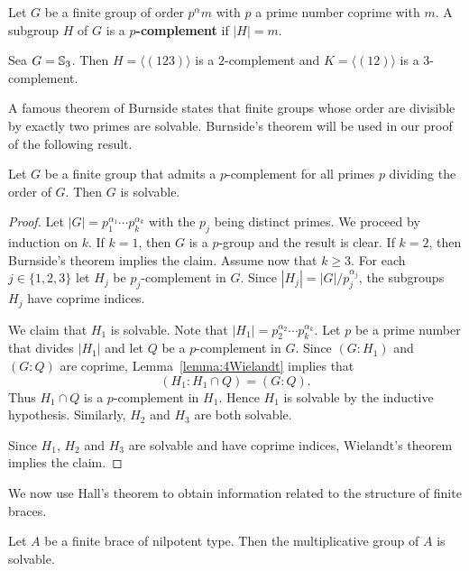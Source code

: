 Let $G$ be a finite group of order $p^{\alpha}m$ with $p$ a prime number coprime with $m$. 
A subgroup $H$ of $G$ is a \textbf{$p$-complement} if $|H|=m$. 

\begin{example}
	Sea $G=\mathbb{S}_3$. Then $H=\langle (123)\rangle$ is a $2$-complement 
	and $K=\langle (12)\rangle$ is a $3$-complement.
\end{example}

A famous theorem of Burnside states that finite groups whose order are divisible 
by exactly two primes are solvable. Burnside's theorem will be used in our proof 
of the following result. 

\begin{theorem}[Hall]
	\label{theorem:Hall:solvable}
	Let $G$ be a finite group that admits a $p$-complement for all primes
	$p$ dividing the order of $G$. Then $G$ is solvable. 
\end{theorem}

\begin{proof}
	Let $|G|=p_1^{\alpha_1}\cdots
	p_k^{\alpha_k}$ with the $p_j$ being distinct primes. We proceed by induction on 
	$k$. If $k=1$, then $G$ is a $p$-group and the result is clear. If $k=2$, then 
	Burnside's theorem implies the claim. Assume now that $k\geq3$. For each 
	$j\in\{1,2,3\}$ let $H_j$ be $p_j$-complement in
	$G$. Since $|H_j|=|G|/p_j^{\alpha_j}$, the subgroups $H_j$ have coprime indices. 
	
	We claim that $H_1$ is solvable. Note that $|H_1|=p_2^{\alpha_2}\cdots
	p_k^{\alpha_k}$. Let $p$ be a prime number that divides $|H_1|$ and let $Q$ be a 
	$p$-complement in $G$. 
	Since $(G:H_1)$ and $(G:Q)$ are coprime, Lemma~\ref{lemma:4Wielandt} implies that 
	\[
	(H_1:H_1\cap Q)=(G:Q).
	\]
	Thus $H_1\cap Q$ is a $p$-complement in $H_1$. Hence $H_1$ is
	solvable by the inductive hypothesis. Similarly, $H_2$ and 
	$H_3$ are both solvable. 
	
	Since $H_1$, $H_2$ and $H_3$ are solvable and have coprime indices, Wielandt's theorem
	implies the claim. 
\end{proof}

We now use Hall's theorem to obtain information related to the
structure of finite braces. 

\begin{theorem}
\label{thm:add_nilpotent}
Let $A$ be a finite brace of nilpotent type. Then 
the multiplicative group of $A$ is solvable.
\end{theorem}

